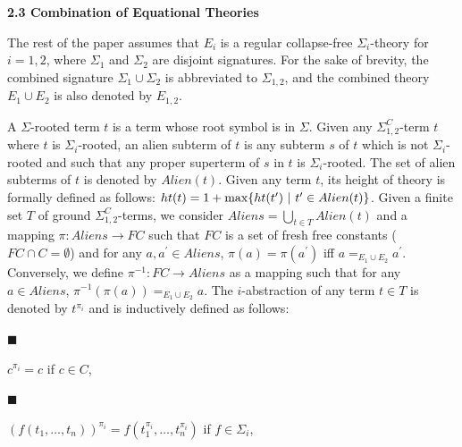  
 
\par\medskip\noindent\textbf{2.3 Combination of Equational Theories}\par
 
 
The rest of the paper assumes that $E_{i}$ is a regular collapse-free $\Sigma_{i}$-theory for $i=1,2$, where $\Sigma_{1}$ and $\Sigma_{2}$ are disjoint signatures. For the sake of brevity, the combined signature $\Sigma_{1}\cup\Sigma_{2}$ is abbreviated to $\Sigma_{1,2}$, and the combined theory $E_{1}\cup E_{2}$ is also denoted by $E_{1,2}$.\par
 
 
 
A $\Sigma$-rooted term $t$ is a term whose root symbol is in $\Sigma$. Given any ${\Sigma}^{C}_{1,2}$-term $t$ where $t$ is $\Sigma_{i}$-rooted, an alien subterm of $t$ is any subterm $s$ of $t$ which is not $\Sigma_{i}$-rooted and such that any proper superterm of $s$ in $t$ is $\Sigma_{i}$-rooted. The set of alien subterms of $t$ is denoted by $Alien(t)$. Given any term $t$, its height of theory is formally defined as follows: $ht(t)=1+\max\{ht(t^{\prime})\leavevmode\nobreak\ |\leavevmode\nobreak\ t^{\prime}\in Alien(t)\}$. Given a finite set $T$ of ground ${\Sigma}^{C}_{1,2}$-terms, we consider $Aliens=\bigcup_{t\in T}\mathit{Alien}(t)$ and a mapping $\pi:Aliens\rightarrow FC$ such that $FC$ is a set of fresh free constants ($FC\cap C=\emptyset$) and for any $a,a^{\prime}\in Aliens$, $\pi(a)=\pi(a^{\prime})$ iff $a=_{E_{1}\cup E_{2}}a^{\prime}$. Conversely, we define $\pi^{-1}:FC\rightarrow Aliens$ as a mapping such that for any $a\in Aliens$, $\pi^{-1}(\pi(a))=_{E_{1}\cup E_{2}}a$. The $i$-abstraction of any term $t\in T$ is denoted by $t^{\pi_{i}}$ and is inductively defined as follows:\par
  
\par\noindent  $\blacksquare$ 
 
$c^{\pi_{i}}=c$ if $c\in C$,\par
 
 
 
\par\noindent  $\blacksquare$ 
 
$(f(t_{1},\dots,t_{n}))^{\pi_{i}}=f(t_{1}^{\pi_{i}},\dots,t_{n}^{\pi_{i}})$ if $f\in\Sigma_{i}$,\par
 
